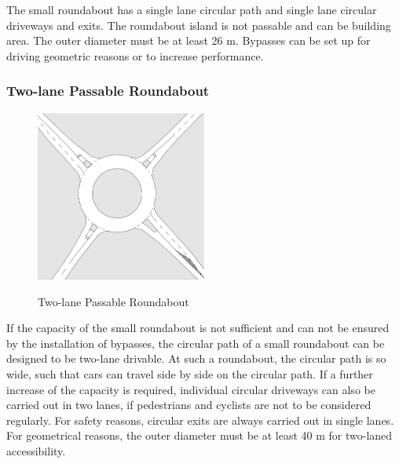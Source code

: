 The small roundabout has a single lane circular path and single lane circular driveways and exits. The roundabout island is not passable and can be building area.
The outer diameter must be at least 26 m. Bypasses can be set up for driving geometric reasons or to increase performance.\cite{man06}


\subsubsection{Two-lane Passable Roundabout}

\begin{figure}[!ht]
\caption{Two-lane Passable Roundabout \cite{man06}}
\includegraphics[width=0.5\textwidth]{bilder/twolaned_roundabout.png} %
\label{roundabout_twolaned}
\end{figure}

%
If the capacity of the small roundabout is not sufficient and can not be ensured by the installation of bypasses,
the circular path of a small roundabout can be designed to be two-lane drivable.
At such a roundabout, the circular path is so wide, such that cars can travel side by side on the circular path.
If a further increase of the capacity is required, individual circular driveways can also be carried out in two lanes, if pedestrians and cyclists are not to be considered regularly.
For safety reasons, circular exits are always carried out in single lanes.
For geometrical reasons, the outer diameter must be at least 40 m for two-laned accessibility.\cite{man06}


